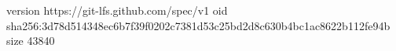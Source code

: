 version https://git-lfs.github.com/spec/v1
oid sha256:3d78d514348ec6b7f39f0202c7381d53c25bd2d8c630b4bc1ac8622b112fe94b
size 43840
